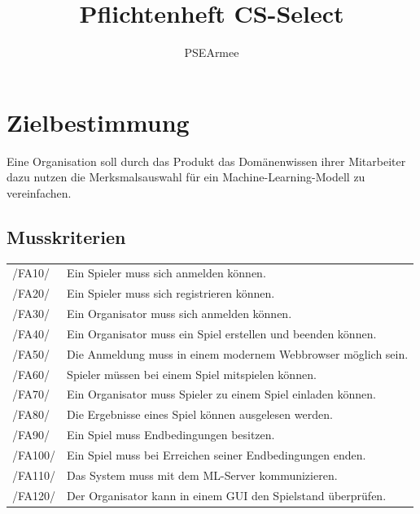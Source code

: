 \documentclass[a4paper]{scrreprt}
\begin{document}
    \title{Pflichtenheft CS-Select}
    \author{PSEArmee}
    \maketitle

    \tableofcontents

    \chapter{Zielbestimmung}
    Eine Organisation soll durch das \Gls{Produkt} das Domänenwissen ihrer Mitarbeiter dazu nutzen die Merksmalsauswahl für ein Machine-Learning-Modell zu vereinfachen.

    \section{Musskriterien}
    \begin{tabular}{ l | l}
        /FA10/ & Ein \Gls{Spieler} muss sich anmelden können. \\
        /FA20/ & Ein \Gls{Spieler} muss sich registrieren können. \\
        /FA30/ & Ein \Gls{Organisator} muss sich anmelden können. \\
        /FA40/ & Ein \Gls{Organisator} muss ein \Gls{Spiel} erstellen und beenden können. \\
        /FA50/ & Die Anmeldung muss in einem modernem \Gls{Webbrowser} möglich sein. \\
        /FA60/ & \Gls{Spieler} müssen bei einem \Gls{Spiel} mitspielen können. \\
        /FA70/ & Ein \Gls{Organisator} muss \Gls{Spieler} zu einem \Gls{Spiel} einladen können. \\
        /FA80/ & Die Ergebnisse eines \Gls{Spiel} können ausgelesen werden. \\
        /FA90/ & Ein Spiel muss Endbedingungen besitzen. \\
        /FA100/ & Ein Spiel muss bei Erreichen seiner Endbedingungen enden. \\
        /FA110/ & Das System muss mit dem ML-Server kommunizieren. \\
        /FA120/ & Der Organisator kann in einem GUI den Spielstand überprüfen.\\
    \end{tabular}
\end{document}
